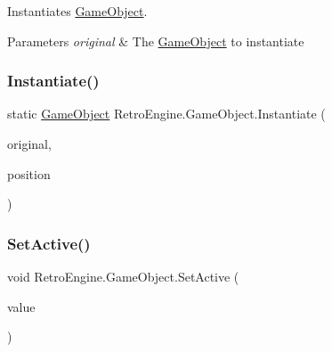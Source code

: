 Instantiates \mbox{\hyperlink{class_retro_engine_1_1_game_object}{Game\+Object}}. 


\begin{DoxyParams}{Parameters}
{\em original} & The \mbox{\hyperlink{class_retro_engine_1_1_game_object}{Game\+Object}} to instantiate\\
\hline
\end{DoxyParams}
\mbox{\label{class_retro_engine_1_1_game_object_ad2b9d968a8be8c0ac5ae601960b18d8d}} 
\subsubsection{\texorpdfstring{Instantiate()}{Instantiate()}\hspace{0.1cm}{\footnotesize\ttfamily [2/2]}}
{\footnotesize\ttfamily static \mbox{\hyperlink{class_retro_engine_1_1_game_object}{Game\+Object}} Retro\+Engine.\+Game\+Object.\+Instantiate (\begin{DoxyParamCaption}\item[{\mbox{\hyperlink{class_retro_engine_1_1_game_object}{Game\+Object}}}]{original,  }\item[{\mbox{\hyperlink{struct_retro_engine_1_1_vector2}{Vector2}}}]{position }\end{DoxyParamCaption})\hspace{0.3cm}{\ttfamily [static]}}

\mbox{\label{class_retro_engine_1_1_game_object_aebdebfc0989ef3a488a049fab8b2fc51}} 
\subsubsection{\texorpdfstring{SetActive()}{SetActive()}}
{\footnotesize\ttfamily void Retro\+Engine.\+Game\+Object.\+Set\+Active (\begin{DoxyParamCaption}\item[{bool}]{value }\end{DoxyParamCaption})}

\mbox{\label{class_retro_engine_1_1_game_object_a9cfe690613c77cce1bde19bba1ac8e9d}} 
